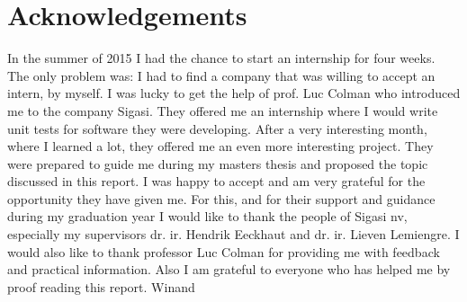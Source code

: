 \chapter*{Acknowledgements}
In the summer of 2015 I had the chance to start an internship for four weeks. The only problem was: I had to find a company that was willing to accept an intern, by myself. I was lucky to get the help of prof. Luc Colman who introduced me to the company Sigasi. They offered me an internship where I would write unit tests for software they were developing. After a very interesting month, where I learned a lot, they offered me an even more interesting project. They were prepared to guide me during my masters thesis and proposed the topic discussed in this report. I was happy to accept and am very grateful for the opportunity they have given me. For this, and for their support and guidance during my graduation year I would like to thank the people of Sigasi nv, especially my supervisors dr. ir. Hendrik Eeckhaut and dr. ir. Lieven Lemiengre.
\npar
I would also like to thank professor Luc Colman for providing me with feedback and practical information. Also I am grateful to everyone who has helped me by proof reading this report.
\npar
Winand